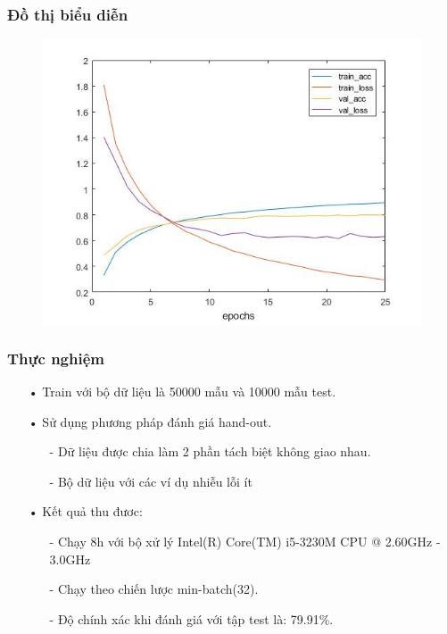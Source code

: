 \documentclass[a4paper,12pt]{report}
\begin{document}
\subsubsection{Đồ thị biểu diễn}
\begin{figure}[h]
\begin{center}
\includegraphics[width =1.0 \textwidth]{graph.png}
\end{center}
\end{figure}
\subsubsection{Thực nghiệm}
\begin{itemize}
\item[•] Train với bộ dữ liệu là 50000 mẫu và 10000 mẫu test.
\item[•] Sử dụng phương pháp đánh giá hand-out.
\begin{itemize}
\item[-] Dữ liệu được chia làm 2 phần tách biệt không giao nhau.
\item[-] Bộ dữ liệu với các ví dụ nhiễu lỗi ít
\end{itemize}
\item[•] Kết quả thu đươc:
\begin{itemize}
\item[-] Chạy 8h với bộ xử lý Intel(R) Core(TM) i5-3230M CPU @ 2.60GHz - 3.0GHz
\item[-] Chạy theo chiến lược min-batch(32).
\item[-] Độ chính xác khi đánh giá với tập test là: 79.91\%.
\end{itemize}
\end{itemize}
\end{document}
